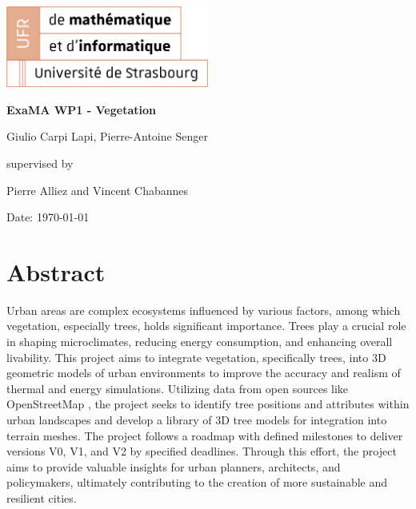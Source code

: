 \documentclass[12pt]{article}
\begin{document}
\begin{titlepage}
\centering
\includegraphics[width=0.5\textwidth]{images/logo_ufr.png}\par\vspace{1cm}
\vspace{1.5cm}
{\huge\bfseries ExaMA WP1 - Vegetation\par}
\vspace{2cm}
{\Large Giulio Carpi Lapi, Pierre-Antoine Senger\par}
\vfill
supervised by\par
Pierre Alliez and Vincent Chabannes

\vfill

{\large Date: \today\par}
\end{titlepage}

\tableofcontents
\newpage

\section{Abstract}
Urban areas are complex ecosystems influenced by various factors, among which 
vegetation, especially trees, holds significant importance. Trees play a crucial 
role in shaping microclimates, reducing energy consumption, and enhancing overall 
livability\cite{TIR4sTREEt}. This project aims to integrate vegetation, specifically trees, into 3D 
geometric models of urban environments to improve the accuracy and realism of thermal 
and energy simulations. Utilizing data from open sources like OpenStreetMap , the project 
seeks to identify tree positions and attributes within urban landscapes and develop 
a library of 3D tree models for integration into terrain meshes. The project follows
 a roadmap with defined milestones to deliver versions V0, V1, and V2 by specified 
 deadlines. Through this effort, the project aims to provide valuable insights for
  urban planners, architects, and policymakers, ultimately contributing to the
   creation of more sustainable and resilient cities.
\end{document}
